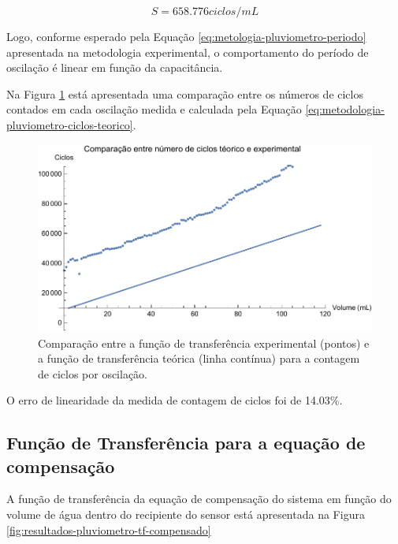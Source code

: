 \documentclass[a4paper]{instrumentacao}
\begin{document}
\begin{equation}
	S = 658.776 ciclos/mL
	\label{eq:resultados-pluviometro-ciclos-sensibilidade}
\end{equation}

Logo, conforme esperado pela Equação \ref{eq:metologia-pluviometro-periodo} apresentada na metodologia experimental, o comportamento do período de oscilação é linear em função da capacitância.

Na Figura \ref{fig:resultados-pluviometro-ciclos-comparacao} está apresentada uma comparação entre os números de ciclos contados em cada oscilação medida e calculada pela Equação \ref{eq:metodologia-pluviometro-ciclos-teorico}.

\begin{figure}[H]
	\centering \includegraphics[width=\textwidth]{Nivel/Experimental/Ciclos-Comparacao.pdf}
	\caption{Comparação entre a função de transferência experimental (pontos) e a função de transferência teórica (linha contínua) para a contagem de ciclos por oscilação.}
	\label{fig:resultados-pluviometro-ciclos-comparacao}
\end{figure}

O erro de linearidade da medida de contagem de ciclos foi de 14.03\%.

\subsection{Função de Transferência para a equação de compensação}

A função de transferência da equação de compensação do sistema em função do volume de água dentro do recipiente do sensor está apresentada na Figura \ref{fig:resultados-pluviometro-tf-compensado}
\end{document}
